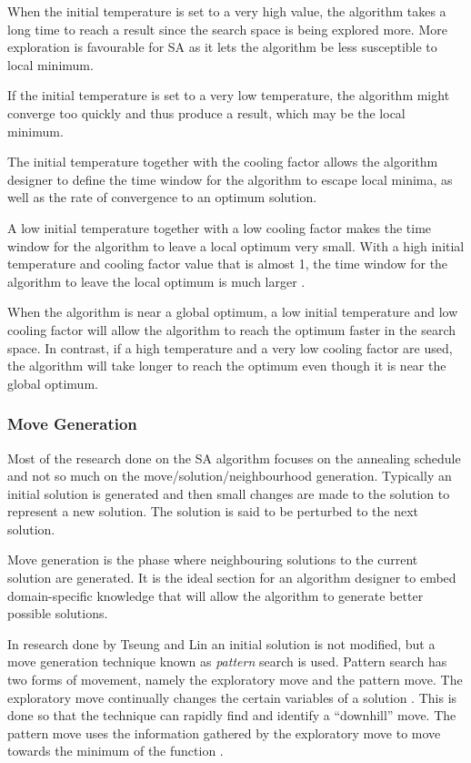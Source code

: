 When the initial temperature is set to a very high value, the algorithm takes a long time to reach a result since the search space is being explored more\cite{SALongestCommon,VariousCoolingSA}. More exploration is favourable for \gls{SA} as it lets the algorithm be less susceptible to local minimum. 

If the initial temperature is set to a very low temperature, the algorithm might converge too quickly and thus produce a result, which may be the local minimum\cite{SALongestCommon,VariousCoolingSA,AutoConfigSA}.

The initial temperature together with the cooling factor allows the algorithm designer to define the time window for the algorithm to escape local minima, as well as the rate of convergence to an optimum solution\cite{SALongestCommon,VariousCoolingSA}.

A low initial temperature together with a low cooling factor makes the time window for the algorithm to leave a local optimum very small\cite{SALongestCommon}. With a high initial temperature and cooling factor value that is almost 1, the time window for the algorithm to leave the local optimum is much larger \cite{SALongestCommon}. 

When the algorithm is near a global optimum, a low initial temperature and low cooling factor will allow the algorithm to reach the optimum faster in the search space\cite{SALongestCommon}. In contrast, if a high temperature and a very low cooling factor are used, the algorithm will take longer to reach the optimum even though it is near the global optimum\cite{SALongestCommon}.

\subsubsection{Move Generation}
Most of the research done on the \gls{SA} algorithm focuses on the annealing schedule and not so much on the move/solution/neighbourhood generation. Typically an initial solution is generated and then small changes are made to the solution to represent a new solution. The solution is said to be perturbed to the next solution.

Move generation is the phase where neighbouring solutions to the current solution are generated. It is the ideal section for an algorithm designer to embed domain-specific knowledge that will allow the algorithm to generate better possible solutions.

In research done by Tseung and Lin \cite{CurveFittingSA} an initial solution is not modified, but a move generation technique known as \emph{pattern} search is used. Pattern search has two forms of movement, namely the exploratory move and the pattern move. The exploratory move continually changes the certain variables of a solution \cite{CurveFittingSA}. This is done so that the technique can rapidly find and identify a ``downhill'' move. The pattern move uses the information gathered by the exploratory move to move towards the minimum of the function \cite{CurveFittingSA}.
